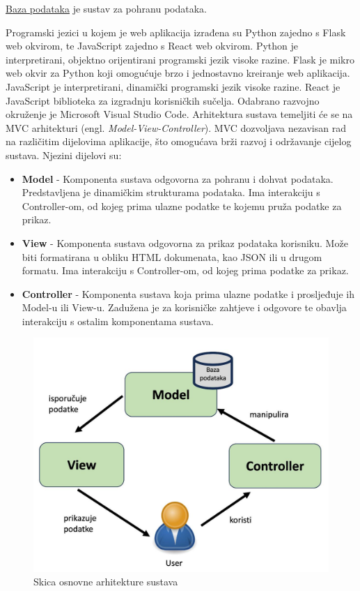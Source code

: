 	\underline{Baza podataka} je sustav za pohranu podataka.

	Programski jezici u kojem je web aplikacija izrađena su Python zajedno s Flask web okvirom, te JavaScript zajedno s React web okvirom. Python je interpretirani, objektno orijentirani programski jezik visoke razine. Flask je mikro web okvir za Python koji omogućuje brzo i jednostavno kreiranje web aplikacija. JavaScript je interpretirani, dinamički programski jezik visoke razine. React je JavaScript biblioteka za izgradnju korisničkih sučelja. Odabrano razvojno okruženje je Microsoft Visual Studio Code.
	Arhitektura sustava temeljiti će se na MVC arhitekturi (engl. \textit{Model-View-Controller}). MVC dozvoljava nezavisan rad na različitim dijelovima aplikacije, što omogućava brži razvoj i održavanje cijelog sustava. Njezini dijelovi su:
	\begin{itemize}
		\item \textbf{Model} - Komponenta sustava odgovorna za pohranu i dohvat podataka. Predstavljena je dinamičkim strukturama podataka. Ima interakciju s Controller-om, od kojeg prima ulazne podatke te kojemu pruža podatke za prikaz.
		\item \textbf{View} - Komponenta sustava odgovorna za prikaz podataka korisniku. Može biti formatirana u obliku HTML dokumenata, kao JSON ili u drugom formatu. Ima interakciju s Controller-om, od kojeg prima podatke za prikaz.
		\item \textbf{Controller} - Komponenta sustava koja prima ulazne podatke i prosljeđuje ih Model-u ili View-u. Zadužena je za korisničke zahtjeve i odgovore te obavlja interakciju s ostalim komponentama sustava.
	\end{itemize}

	\begin{figure}[htbp]
		\centering
		\includegraphics[width=1\textwidth]{slike/skica_mvc.jpg}
		\caption{Skica osnovne arhitekture sustava}
	\label{fig:my_image}
	\end{figure}

